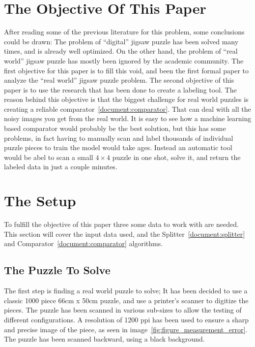 \documentclass{article}
\begin{document}
\section{The Objective Of This Paper}
After reading some of the previous literature for this problem, some conclusions could be drawn:
The problem of ``digital'' jigsaw puzzle has been solved many times, and is already well optimized.\newline
On the other hand, the problem of ``real world'' jigsaw puzzle has mostly been ignored
by the academic community.\newline
The first objective for this paper is to fill this void, and been the first formal paper to analyze the
``real world'' jigsaw puzzle problem.\newline
The second objective of this paper is to use the research that has been done to create a labeling tool.\newline
The reason behind this objective is that the biggest challenge for real world puzzles is creating a
reliable comparator~\ref{document:comparator}. That can deal with all the noisy 
images you get from the real world.\newline
It is easy to see how a machine learning based comparator would probably be the best solution, 
but this has some problems, in fact having to manually scan and label thousands of individual puzzle
pieces to train the model would take ages.
Instead an automatic tool would be abel to scan a small $4\times4$ puzzle in one shot,
solve it, and return the labeled data in just a couple minutes.


\section{The Setup}

To fulfill the objective of this paper three some data to work with are needed.
This section will cover the input data used, and the Splitter~\ref{document:splitter}
and Comparator~\ref{document:comparator} algorithms.

\subsection{The Puzzle To Solve}

The first step is finding a real world puzzle to solve;
It has been decided to use a classic 1000 piece 66cm x 50cm  puzzle, and use a printer's
scanner to digitize the pieces.\newline 
The puzzle has been scanned in various sub-sizes to allow the testing of different configurations. 
A resolution of 1200 ppi has been used to ensure a sharp and precise image
of the piece, as seen in image~\ref{fig:figure_measurement_error}.
The puzzle has been scanned backward, using a black background.
\end{document}
